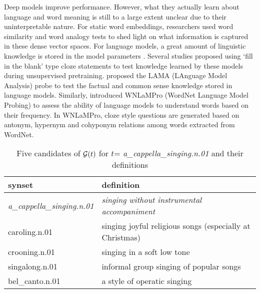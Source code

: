 \documentclass[11pt,a4paper]{article}
\begin{document}

Deep models improve performance. However,
what they actually learn about language and word meaning  is
still to a large extent unclear due to their uninterpretable
nature. For static word embeddings, researchers used word
similarity \cite{hill15simlex} and word analogy
\cite{gladkova16analogy} tests to shed light on what
information is captured in these dense vector spaces. For
language models, a great amount of linguistic knowledge is
stored in the model parameters \cite{peters18dissecting}.
Several studies proposed using `fill in the blank' type
cloze statements to test  knowledge learned by these models
during unsupervised pretraining. 
proposed the LAMA (LAnguage Model Analysis) probe to test
the factual and common sense knowledge stored in  language
models.
Similarly, \citet{Schick20rareWords} introduced WNLaMPro
(WordNet Language Model Probing)  to assess the ability of
language models to understand words based on their
frequency. In WNLaMPro, cloze style questions are generated
based on antonym, hypernym and cohyponym relations among
words extracted from WordNet.


\begin{table*}
    \centering
    \begin{tabular}{l|l}
    \hline
    \textbf{synset} & \textbf{definition} \\ \hline
    \emph{a\_cappella\_singing.n.01} & \emph{singing without instrumental accompaniment} \\
     caroling.n.01 & singing joyful religious songs (especially at Christmas) \\
     crooning.n.01 & singing in a soft low tone \\
     singalong.n.01 & informal group singing of popular songs \\
     bel\_canto.n.01 & a style of operatic singing \\ \hline
   
    \end{tabular}
    \caption{Five candidates of ${\cal G}(t)$ for $t$=  \emph{a\_cappella\_singing.n.01} and their definitions} 
    \label{tab:dataset_samples}
\end{table*}
\end{document}

